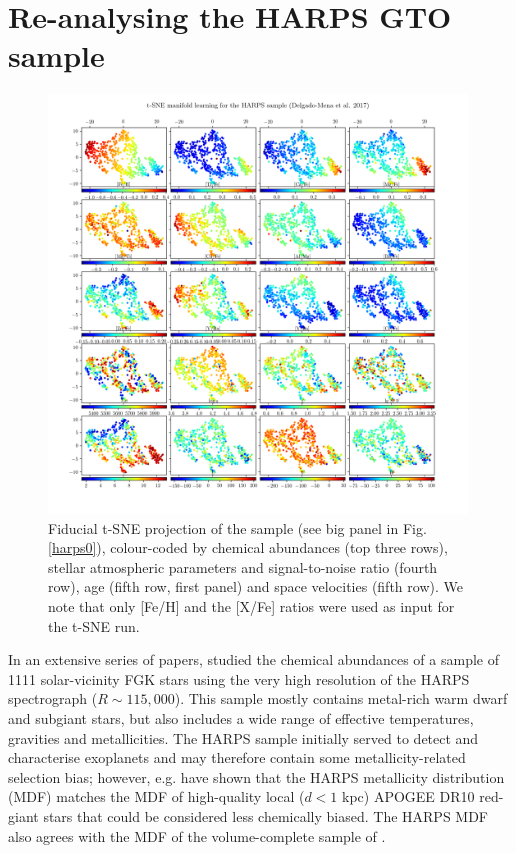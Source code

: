 \documentclass{aa}  %
\begin{document}
\section{Re-analysing the HARPS GTO sample}\label{harps}

\begin{figure}\centering
 \includegraphics[width=0.99\textwidth]{im/HARPS_tsne_plots_withteffcut40_rand0.png}
\caption{Fiducial t-SNE projection of the \citet{DelgadoMena2017} sample (see big panel in Fig. \ref{harps0}), colour-coded by chemical abundances (top three rows), stellar atmospheric parameters and signal-to-noise ratio (fourth row), age (fifth row, first panel) and space velocities (fifth row). We note that only [Fe/H] and the [X/Fe] ratios were used as input for the t-SNE run.}
\label{harps1}
\end{figure}

In an extensive series of papers, \citet{Adibekyan2011, Adibekyan2012, DelgadoMena2014, DelgadoMena2015, BertrandeLis2015, Suarez-Andres2017, DelgadoMena2017, DelgadoMena2018} studied the chemical abundances of a sample of 1111 solar-vicinity FGK stars using the very high resolution of the HARPS spectrograph ($R\sim 115,000$). This sample mostly contains metal-rich warm dwarf and subgiant stars, but also includes a wide range of effective temperatures, gravities and metallicities. The HARPS sample initially served to detect and characterise exoplanets and may therefore contain some metallicity-related selection bias; however, e.g. \citet{Anders2014} have shown that the HARPS metallicity distribution (MDF) matches the MDF of high-quality local ($d<1$ kpc) APOGEE DR10 red-giant stars that could be considered less chemically biased. The HARPS MDF also agrees with the MDF of the volume-complete sample of \citet{Fuhrmann2011}.
\end{document}

